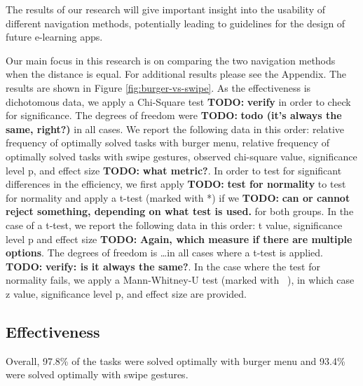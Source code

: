\documentclass{sig-alternate-05-2015}
\newcommand{\todo}{\textbf{TODO:} \textbf}
\begin{document}
The results of our research will give important insight into the usability of
different navigation methods, potentially leading to guidelines for the design
of future e-learning apps.



Our main focus in this research is on comparing the two navigation methods when the distance is equal. For additional results please see the Appendix. 
The results are shown in Figure \ref{fig:burger-vs-swipe}. As the effectiveness is dichotomous data, we apply
a Chi-Square test \todo{verify} in order to check for significance. The degrees of freedom were \todo{todo (it's always the same, right?)} in all cases.
We report the following data in this order:
relative frequency of optimally solved tasks with burger menu, relative frequency of optimally solved tasks with swipe gestures, observed chi-square value, 
significance level p, and effect size \todo{what metric?}. In order to test for significant differences in the efficiency, we first apply \todo{test for
normality} to test for normality and apply a t-test (marked with *) if we \todo{can or cannot reject something, depending on what test is used.} for both groups.
In the case of a t-test, we report the following data in this order: t value, significance level p and effect size \todo{Again, which measure if there are multiple
options}. The degrees of freedom is \ldots in all cases where a t-test is applied. \todo{verify: is it always the same?}.
In the case where the test for normality fails, we apply a Mann-Whitney-U test (marked with ~), in which case z value, significance level p, and effect size are provided.
\begin{table}[!h]
\centering
\caption{Comparing burger and swipe for same d}
\label{fig:burger-vs-swipe}
\end{table}

\subsection{Effectiveness}
Overall, 97.8\% of the tasks were solved optimally with burger menu and 93.4\% were solved optimally with swipe gestures.
\end{document}
